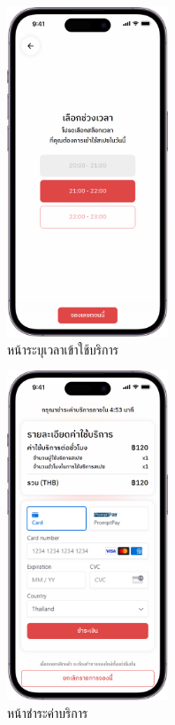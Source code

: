 \begin{figure}[ht]
    \begin{center}
    \includegraphics[width=1.9in]{./image/Flowy_book_time_slot.png}
    \end{center}
    \caption[Flowy book time slot]{หน้าระบุเวลาเข้าใช้บริการ}
    \label{fig:Flowy_book_time_slot}
\end{figure}
\begin{figure}[ht]
    \begin{center}
    \includegraphics[width=1.9in]{./image/Flowy_payment.png}
    \end{center}
    \caption[Flowy payment]{หน้าชำระค่าบริการ}
    \label{fig:Flowy_payment}
\end{figure}

